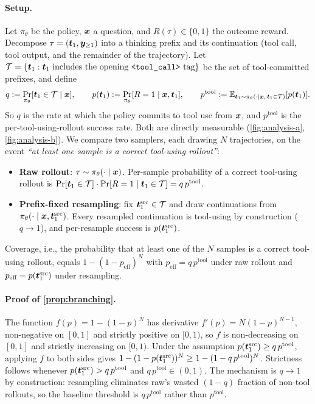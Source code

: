\paragraph{Setup.}
Let $\pi_\theta$ be the policy, ${\bm{x}}$ a question, and $R(\tau) \in \{0,1\}$ the outcome reward. Decompose $\tau = ({\bm{t}}_1, {\bm{y}}_{\geq 1})$ into a thinking prefix and its continuation (tool call, tool output, and the remainder of the trajectory). Let $\mathcal{T} = \{{\bm{t}}_1 : {\bm{t}}_1 \text{ includes the opening } \texttt{<tool\_call>} \text{ tag}\}$ be the set of tool-committed prefixes, and define
\[
    q := \Pr_{\pi_\theta}[{\bm{t}}_1 \in \mathcal{T} \mid {\bm{x}}], \qquad
    p({\bm{t}}_1) := \Pr_{\pi_\theta}[R=1 \mid {\bm{x}}, {\bm{t}}_1], \qquad
    p^{\text{tool}} := \mathbb{E}_{{\bm{t}}_1 \sim \pi_\theta(\cdot \mid {\bm{x}},\, {\bm{t}}_1 \in \mathcal{T})}[p({\bm{t}}_1)].
\]
So $q$ is the rate at which the policy commits to tool use from ${\bm{x}}$, and $p^{\text{tool}}$ is the per-tool-using-rollout success rate. Both are directly measurable (\autoref{fig:analysis-a}, \autoref{fig:analysis-b}). We compare two samplers, each drawing $N$ trajectories, on the event \emph{``at least one sample is a correct tool-using rollout''}:
\begin{itemize}[leftmargin=*, topsep=2pt, itemsep=1pt]
    \item \textbf{Raw rollout}: $\tau \sim \pi_\theta(\cdot \mid {\bm{x}})$. Per-sample probability of a correct tool-using rollout is $\Pr[{\bm{t}}_1 \in \mathcal{T}] \cdot \Pr[R=1 \mid {\bm{t}}_1 \in \mathcal{T}] = q\, p^{\text{tool}}$.
    \item \textbf{Prefix-fixed resampling}: fix ${\bm{t}}_1^{\text{src}} \in \mathcal{T}$ and draw continuations from $\pi_\theta(\cdot \mid {\bm{x}}, {\bm{t}}_1^{\text{src}})$. Every resampled continuation is tool-using by construction ($q \to 1$), and per-resample success is $p({\bm{t}}_1^{\text{src}})$.
\end{itemize}
Coverage, i.e., the probability that at least one of the $N$ samples is a correct tool-using rollout, equals $1 - (1-p_{\text{eff}})^N$ with $p_{\text{eff}} = q\, p^{\text{tool}}$ under raw rollout and $p_{\text{eff}} = p({\bm{t}}_1^{\text{src}})$ under resampling.

\paragraph{Proof of \autoref{prop:branching}.}
The function $f(p) = 1 - (1-p)^N$ has derivative $f'(p) = N(1-p)^{N-1}$, non-negative on $[0,1]$ and strictly positive on $[0,1)$, so $f$ is non-decreasing on $[0,1]$ and strictly increasing on $[0,1)$. Under the assumption $p({\bm{t}}_1^{\text{src}}) \geq q\, p^{\text{tool}}$, applying $f$ to both sides gives $1 - (1-p({\bm{t}}_1^{\text{src}}))^N \geq 1 - (1 - q\, p^{\text{tool}})^N$. Strictness follows whenever $p({\bm{t}}_1^{\text{src}}) > q\, p^{\text{tool}}$ and $q\, p^{\text{tool}} \in (0,1)$. The mechanism is $q \to 1$ by construction: resampling eliminates raw's wasted $(1-q)$ fraction of non-tool rollouts, so the baseline threshold is $q\, p^{\text{tool}}$ rather than $p^{\text{tool}}$.

